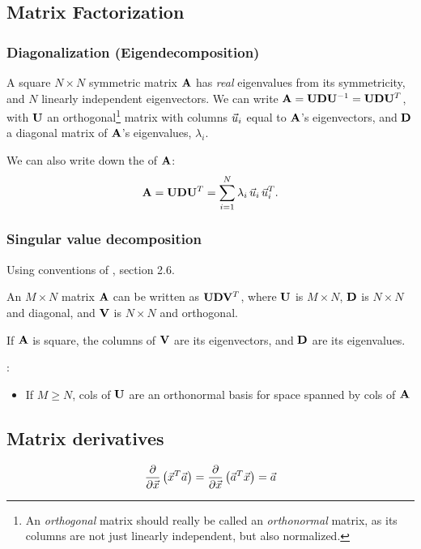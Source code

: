 \documentclass[11pt]{article}
\begin{document}
\begin{appendices}
\subsection{Matrix Factorization}
\subsubsection{Diagonalization (Eigendecomposition)}
\label{subsubsec:matrix}
A square $N \times N$ symmetric matrix $\mathbf{A}$ has \emph{real} eigenvalues from its
symmetricity, and $N$ linearly independent eigenvectors.  We can write
$\mathbf{A} = \mathbf{U} \mathbf{D} \mathbf{U}^{-1} = \mathbf{U} \mathbf{D} \mathbf{U}^T$, with $\mathbf{U}$ an orthogonal\footnote{An
  \emph{orthogonal} matrix should really be called an \emph{orthonormal} matrix, as its
  columns are not just linearly independent, but also normalized.} matrix with columns
$\vec{u}_i$ equal to $\mathbf{A}$'s eigenvectors, and $\mathbf{D}$ a diagonal matrix of $\mathbf{A}$'s
eigenvalues, $\lambda_i$.

We can also write down the  of $\mathbf{A}$:
\begin{equation}
  \mathbf{A} = \mathbf{U} \mathbf{D} \mathbf{U}^T = \sum_{i=1}^N \lambda_i\, \vec{u}_i\, \vec{u}_i^T.
\end{equation}


\subsubsection{Singular value decomposition}
\label{subsubsec:SVD}
Using conventions of \cite{PRESS}, section 2.6.

An $M \times N$ matrix $\mathbf{A}$ can be written as $\mathbf{U} \mathbf{D} \mathbf{V}^T$, where $\mathbf{U}$ is
$M \times N$, $\mathbf{D}$ is $N \times N$ and diagonal, and $\mathbf{V}$ is $N \times N$ and
orthogonal.

If $\mathbf{A}$ is square, the columns of $\mathbf{V}$ are its eigenvectors, and $\mathbf{D}$ are its
eigenvalues.

:
\begin{itemize}
  \item If $M \geq N$, cols of $\mathbf{U}$ are an orthonormal basis for space spanned by cols
  of $\mathbf{A}$
\end{itemize}

\TODOFIN{}

\subsection{Matrix derivatives}

\begin{equation}
  \frac{\partial}{\partial \vec{x}} \left( \vec{x}^T \vec{a} \right) =
  \frac{\partial}{\partial \vec{x}} \left( \vec{a}^T \vec{x} \right) =
  \vec{a} 
\end{equation}


\end{appendices}
\end{document}
